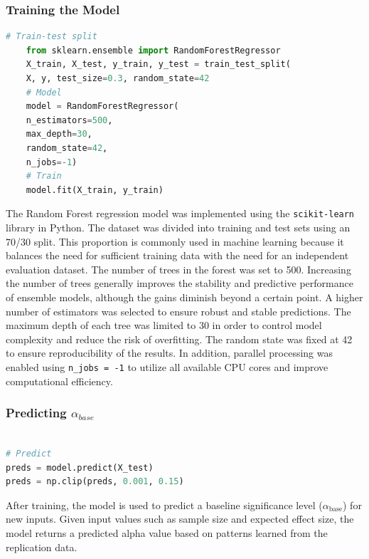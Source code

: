 {\subsubsection*{Training the Model}

\begin{lstlisting}[language=Python]
		# Train-test split
	from sklearn.ensemble import RandomForestRegressor
	X_train, X_test, y_train, y_test = train_test_split(
	X, y, test_size=0.3, random_state=42
	# Model
	model = RandomForestRegressor(
	n_estimators=500,
	max_depth=30,
	random_state=42,
	n_jobs=-1)
	# Train
	model.fit(X_train, y_train)
\end{lstlisting}



The Random Forest regression model was implemented using the \texttt{scikit-learn} library in Python. The dataset was divided into training and test sets using an 70/30 split. This proportion is commonly used in machine learning because it balances the need for sufficient training data with the need for an independent evaluation dataset. The number of trees in the forest was set to 500. Increasing the number of trees generally improves the stability and predictive performance of ensemble models, although the gains diminish beyond a certain point\cite{Breiman2001}. A higher number of estimators was selected to ensure robust and stable predictions. The maximum depth of each tree was limited to 30 in order to control model complexity and reduce the risk of overfitting. The random state was fixed at 42 to ensure reproducibility of the results. In addition, parallel processing was enabled using \texttt{n\_jobs = -1} to utilize all available CPU cores and improve computational efficiency\cite{scikit-learn2023}.

\subsubsection*{Predicting $\alpha_{base}$}

\begin{lstlisting}[language=Python]

# Predict
preds = model.predict(X_test)
preds = np.clip(preds, 0.001, 0.15)
\end{lstlisting}
After training, the model is used to predict a baseline significance level ($\alpha_{\text{base}}$) for new inputs. Given input values such as sample size and expected effect size, the model returns a predicted alpha value based on patterns learned from the replication data.

}
